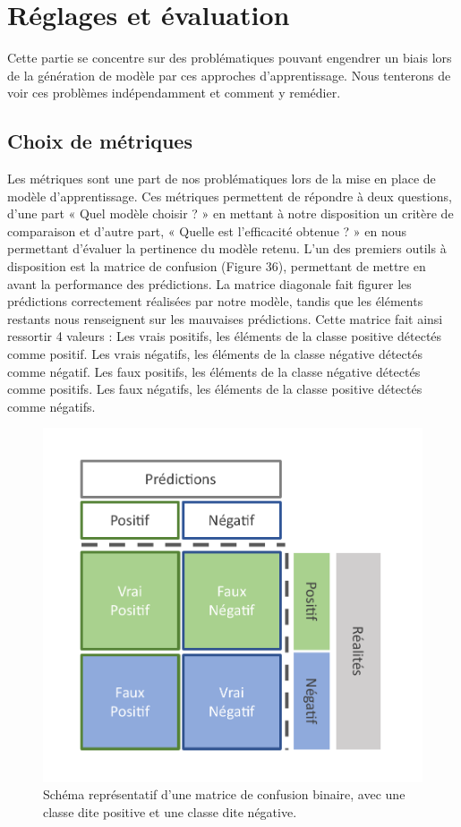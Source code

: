 \section{Réglages et évaluation}
Cette partie se concentre sur des problématiques pouvant engendrer un biais lors de la génération de modèle par ces approches d’apprentissage. Nous tenterons de voir ces problèmes indépendamment et comment y remédier.

\subsection{Choix de métriques}
Les métriques sont une part de nos problématiques lors de la mise en place de modèle d’apprentissage. Ces métriques permettent de répondre à deux questions, d’une part « Quel modèle choisir ? » en mettant à notre disposition un critère de comparaison et d’autre part, « Quelle est l’efficacité obtenue ? » en nous permettant d’évaluer la pertinence du modèle retenu.
L’un des premiers outils à disposition est la matrice de confusion (Figure 36), permettant de mettre en avant la performance des prédictions. La matrice diagonale fait figurer les prédictions correctement réalisées par notre modèle, tandis que les éléments restants nous renseignent sur les mauvaises prédictions. Cette matrice fait ainsi ressortir 4 valeurs :
	Les vrais positifs, les éléments de la classe positive détectés comme positif.
	Les vrais négatifs, les éléments de la classe négative détectés comme négatif.
	Les faux positifs, les éléments de la classe négative détectés comme positifs.
	Les faux négatifs, les éléments de la classe positive détectés comme négatifs.

\begin{figure}[H]
    \centering
    \includegraphics[width=\linewidth]{contents/chapter_3/resources/confusion_matrix.pdf}
    \caption{Schéma représentatif d’une matrice de confusion binaire, avec une classe dite positive et une classe dite négative.}
    \label{fig:chapter_3:confusion_matrix}
\end{figure}

